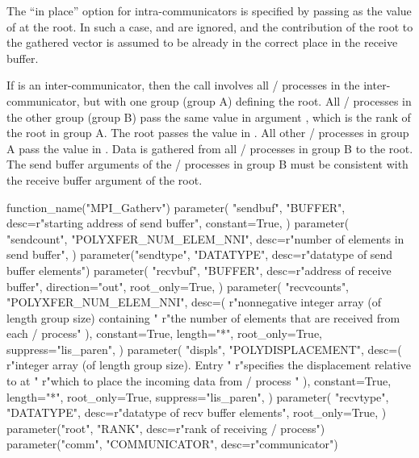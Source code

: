 The ``in place'' option  for intra-communicators is specified by passing
 as
the value of  at the root.  In such a case,
 and  are ignored, and the
contribution of the root to the gathered vector is assumed to be already
in the correct place in the receive buffer.

If  is an inter-communicator, then the call involves all
\MPI/ processes in the inter-communicator, but with one group (group A) defining the
root.  All \MPI/ processes in the other group (group B) pass the same value
in argument
, which is the rank of the root in group A.  The root
passes the value  in .
All other \MPI/ processes in group A pass the value  in
.
Data is gathered from all \MPI/ processes in group B to the root.
The send
buffer arguments of the \MPI/ processes in group B must be consistent with
the receive buffer argument of the root.

\begin{mpi-binding}
    function_name("MPI_Gatherv")
    parameter(
        "sendbuf",
        "BUFFER",
        desc=r"starting address of send buffer",
        constant=True,
    )
    parameter(
        "sendcount",
        "POLYXFER_NUM_ELEM_NNI",
        desc=r"number of elements in send buffer",
    )
    parameter("sendtype", "DATATYPE", desc=r"datatype of send buffer elements")
    parameter(
        "recvbuf",
        "BUFFER",
        desc=r"address of receive buffer",
        direction="out",
        root_only=True,
    )
    parameter(
        "recvcounts",
        "POLYXFER_NUM_ELEM_NNI",
        desc=(
            r"nonnegative integer array (of length group size) containing "
            r"the number of elements that are received from each \MPI/ process"
        ),
        constant=True,
        length="*",
        root_only=True,
        suppress="lis_paren",
    )
    parameter(
        "displs",
        "POLYDISPLACEMENT",
        desc=(
            r"integer array (of length group size). Entry  "
            r"specifies the displacement relative to  at "
            r"which to place the incoming data from \MPI/ process "
        ),
        constant=True,
        length="*",
        root_only=True,
        suppress="lis_paren",
    )
    parameter(
        "recvtype",
        "DATATYPE",
        desc=r"datatype of recv buffer elements",
        root_only=True,
    )
    parameter("root", "RANK", desc=r"rank of receiving \MPI/ process")
    parameter("comm", "COMMUNICATOR", desc=r"communicator")
\end{mpi-binding}

